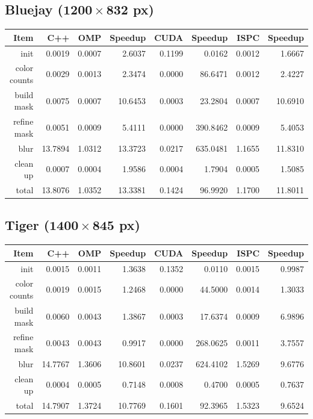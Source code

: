 \documentclass[12pt]{article}
\begin{document}
\subsection{Bluejay ($\mathbf{1200 \times 832}$ px)}

\begin{tabular}{r|r|r|r|r|r|r|r}
    Item & C++ & OMP & Speedup & CUDA & Speedup & ISPC & Speedup
\\  \hline
    init & 0.0019 & 0.0007 & 2.6037 & 0.1199 & 0.0162 & 0.0012 & 1.6667
\\  color counts & 0.0029 & 0.0013 & 2.3474 & 0.0000 & 86.6471 & 0.0012 & 2.4227
\\  build mask & 0.0075 & 0.0007 & 10.6453 & 0.0003 & 23.2804 & 0.0007 & 10.6910
\\  refine mask & 0.0051 & 0.0009 & 5.4111 & 0.0000 & 390.8462 & 0.0009 & 5.4053
\\  blur & 13.7894 & 1.0312 & 13.3723 & 0.0217 & 635.0481 & 1.1655 & 11.8310
\\  clean up & 0.0007 & 0.0004 & 1.9586 & 0.0004 & 1.7904 & 0.0005 & 1.5085
\\  \hline
    total & 13.8076 & 1.0352 & 13.3381 & 0.1424 & 96.9920 & 1.1700 & 11.8011
\end{tabular}

\subsection{Tiger ($\mathbf{1400 \times 845}$ px)}

\begin{tabular}{r|r|r|r|r|r|r|r}
    Item & C++ & OMP & Speedup & CUDA & Speedup & ISPC & Speedup
\\  \hline
    init & 0.0015 & 0.0011 & 1.3638 & 0.1352 & 0.0110 & 0.0015 & 0.9987
\\  color counts & 0.0019 & 0.0015 & 1.2468 & 0.0000 & 44.5000 & 0.0014 & 1.3033
\\  build mask & 0.0060 & 0.0043 & 1.3867 & 0.0003 & 17.6374 & 0.0009 & 6.9896
\\  refine mask & 0.0043 & 0.0043 & 0.9917 & 0.0000 & 268.0625 & 0.0011 & 3.7557
\\  blur & 14.7767 & 1.3606 & 10.8601 & 0.0237 & 624.4102 & 1.5269 & 9.6776
\\  clean up & 0.0004 & 0.0005 & 0.7148 & 0.0008 & 0.4700 & 0.0005 & 0.7637
\\  \hline
    total & 14.7907 & 1.3724 & 10.7769 & 0.1601 & 92.3965 & 1.5323 & 9.6524
\end{tabular}
\end{document}
